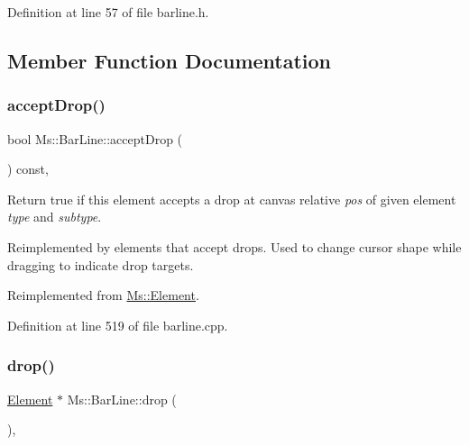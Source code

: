 Definition at line 57 of file barline.\+h.



\subsection{Member Function Documentation}
\mbox{\label{class_ms_1_1_bar_line_a28c7d6fe82e930ac1015e4a0f74d7cca}} 
\subsubsection{\texorpdfstring{accept\+Drop()}{acceptDrop()}}
{\footnotesize\ttfamily bool Ms\+::\+Bar\+Line\+::accept\+Drop (\begin{DoxyParamCaption}\item[{\hyperlink{class_ms_1_1_edit_data}{Edit\+Data} \&}]{ }\end{DoxyParamCaption}) const\hspace{0.3cm}{\ttfamily [override]}, {\ttfamily [virtual]}}

Return true if this element accepts a drop at canvas relative {\itshape pos} of given element {\itshape type} and {\itshape subtype}.

Reimplemented by elements that accept drops. Used to change cursor shape while dragging to indicate drop targets. 

Reimplemented from \hyperlink{class_ms_1_1_element_a35614445f0bc2212cbcc75c3f5810543}{Ms\+::\+Element}.



Definition at line 519 of file barline.\+cpp.

\mbox{\label{class_ms_1_1_bar_line_af03756bb0cd6b98d703bcdaa1c161876}} 
\subsubsection{\texorpdfstring{drop()}{drop()}}
{\footnotesize\ttfamily \hyperlink{class_ms_1_1_element}{Element} $\ast$ Ms\+::\+Bar\+Line\+::drop (\begin{DoxyParamCaption}\item[{\hyperlink{class_ms_1_1_edit_data}{Edit\+Data} \&}]{ }\end{DoxyParamCaption})\hspace{0.3cm}{\ttfamily [override]}, {\ttfamily [virtual]}}

